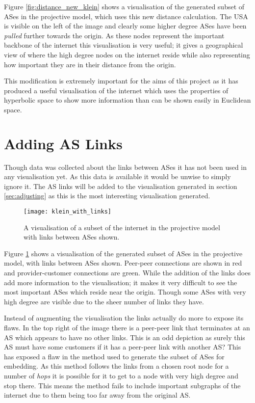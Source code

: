 Figure \ref{fig:distance_new_klein} shows a visualisation of the generated subset of ASes in the projective model, which uses this new distance calculation. The USA is visible on the left of the image and clearly some higher degree ASes have been \textit{pulled} further towards the origin. As these nodes represent the important backbone of the internet this visualisation is very useful; it gives a geographical view of where the high degree nodes on the internet reside while also representing how important they are in their distance from the origin. 

This modification is extremely important for the aims of this project as it has produced a useful visualisation of the internet which uses the properties of hyperbolic space to show more information than can be shown easily in Euclidean space. 

\section{Adding AS Links}
\label{sec:adding_links}

Though data was collected about the links between ASes it has not been used in any visualisation yet. As this data is available it would be unwise to simply ignore it. The AS links will be added to the visualisation generated in section \ref{sec:adjusting} as this is the most interesting visualisation generated. 

\begin{figure}
	\label{fig:with_links}
	\centering
	\texttt{[image: klein\_with\_links]}
	\caption{A visualisation of a subset of the internet in the projective model with links between ASes shown.}
\end{figure}

Figure \ref{fig:with_links} shows a visualisation of the generated subset of ASes in the projective model, with links between ASes shown. Peer-peer connections are shown in red and provider-customer connections are green. While the addition of the links does add more information to the visualisation; it makes it very difficult to see the most important ASes which reside near the origin. Though some ASes with very high degree are visible due to the sheer number of links they have.

Instead of augmenting the visualisation the links actually do more to expose its flaws. In the top right of the image there is a peer-peer link that terminates at an AS which appears to have no other links. This is an odd depiction as surely this AS must have some customers if it has a peer-peer link with another AS? This has exposed a flaw in the method used to generate the subset of ASes for embedding. As this method follows the links from a chosen root node for a number of \textit{hops} it is possible for it to get to a node with very high degree and stop there. This means the method fails to include important subgraphs of the internet due to them being too far away from the original AS. 

